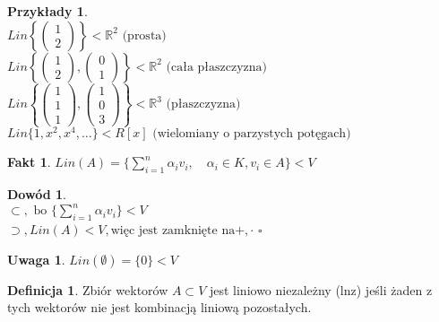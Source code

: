 \documentclass[12pt,a4paper]{article}
\newcommand{\RR}{\mathbb{R}}
\renewcommand{\qed}{$\square$}
\theoremstyle{plain}
\theoremstyle{definition}
\newtheorem{ft}{Fakt}[section]
\theoremstyle{definition}
\newtheorem{df}{Definicja}[section]
\theoremstyle{definition}
\theoremstyle{definition}
\newtheorem*{dd}{Dowód}
\theoremstyle{definition}
\theoremstyle{definition}
\newtheorem*{przy}{Przykłady}
\theoremstyle{definition}
\newtheorem*{uw}{Uwaga}
\theoremstyle{definition}
\begin{document}
\begin{przy}
    ~\\ 
    $Lin\left\{
        \begin{pmatrix}
            1 \\ 
            2
        \end{pmatrix}
    \right\} < \RR^2 \text{ (prosta)}
    $ \\
    $Lin\left\{
        \begin{pmatrix}
            1 \\ 
            2
        \end{pmatrix}, 
        \begin{pmatrix}
            0 \\ 
            1
        \end{pmatrix}
        \right\} < \RR^2 \text{ (cała płaszczyzna)}
    $\\ 
    $
        Lin\left\{
        \begin{pmatrix}
            1 \\ 
            1 \\
            1
        \end{pmatrix}, 
        \begin{pmatrix}
            1 \\ 
            0 \\
            3
        \end{pmatrix}
        \right\} < \RR^3 \text{ (płaszczyzna)}
    $ \\
    $
        Lin\{1,x^2,x^4,\dots\} < R[x] \text{ (wielomiany o parzystych potęgach)}
    $
\end{przy}

\begin{ft}
    $Lin(A) = \{ \sum\limits_{i=1}^{n} \alpha_i v_i, \quad \alpha_i \in K, v_i \in A\} < V$
\end{ft}

\begin{dd}
    ~\\
    $\subset, \text{ bo } \{ \sum\limits_{i=1}^{n} \alpha_i v_i\} < V$ \\
    $\supset, Lin(A) < V, \text{więc jest zamknięte na} +,\cdot$
    \qed
\end{dd}
\begin{uw}
    $Lin(\emptyset)=\{0\} < V $
\end{uw}

\begin{df}
    Zbiór wektorów $ A \subset V $ jest liniowo niezależny (lnz) jeśli żaden z tych wektorów nie jest kombinacją liniową pozostałych.
\end{df}
\end{document}
